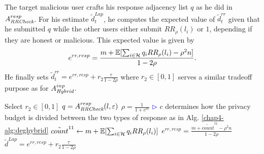 The target malicious user crafts his response adjacency list $q$ as he did in $A_{\textit{RRCheck}}^{resp}$. For his estimate $\tilde{d}_t^{Lap}$, he computes the expected value of $\tilde{d}_t^{rr}$ given that he submitted $q$ while the other users either submit $RR_\rho(l_i)$ or $1$, depending if they are honest or malicious. This expected value is given by
\[
e^{rr, resp} = \frac{m + \operatorname{\mathbb{E}}[\sum_{i \in \mathcal{H}} q_i RR_\rho(l_i) - \rho^2 n]}{1-2\rho}.
\]
He finally sets $\tilde{d}_t^{rr} = e^{rr,resp} + r_2 \frac{\tau}{1-2\rho}$ where $r_2 \in [0,1]$ serves a similar tradeoff purpose as for $A_{\textit{Hybrid}}^{inp}$. 

\begin{algorithm}[bt]
  Select $r_2\in [0,1]$\;
	$q=A_{\textit{RRCheck}}^{resp}(l, \varepsilon)$\;
	$\rho=\frac{1}{1+e^{c\epsilon}}$\;
	\hfill\textcolor{blue}{$\rhd$} $c$ determines how the privacy budget is divided between the two types of response as in Alg. \ref{chap4-alg:deghybrid}\;
	$\tilde{count}^{11} \gets m + \operatorname{\mathbb{E}}[\sum_{i \in \mathcal{H}} q_i RR_\rho(l_i)]$\;
	$e^{rr,resp} = \frac{m + \tilde{count}^{11} - \rho^2 n}{1-2\rho}$\;
	$\tilde{d}^{Lap} = e^{rr,resp} + r_2 \frac{\tau}{1-2\rho}$\;
  \caption{$A_{\DegHybrid}^{resp}: \{0,1\}^n\mapsto\{0,1\}^n$ }
\end{algorithm}

%  
%  


